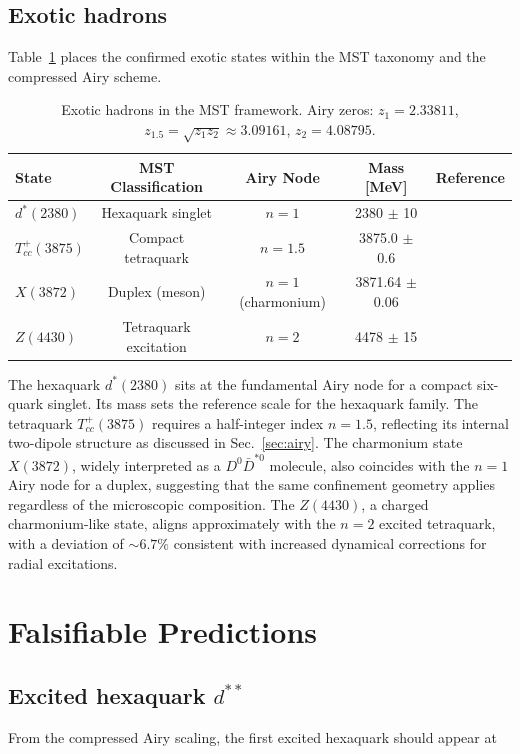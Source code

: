 \documentclass[12pt,a4paper]{article}
\theoremstyle{plain}
\theoremstyle{definition}
\theoremstyle{remark}
\begin{document}
\subsection{Exotic hadrons}
Table~\ref{tab:exotic_data} places the confirmed exotic states within the MST taxonomy and the compressed Airy scheme.

\begin{table}[H]
\centering
\caption{Exotic hadrons in the MST framework. Airy zeros: \(z_1=2.33811\), \(z_{1.5}= \sqrt{z_1 z_2} \approx 3.09161\), \(z_2=4.08795\).}
\label{tab:exotic_data}
\begin{tabular}{lcccc}
\toprule
State & MST Classification & Airy Node & Mass [MeV] & Reference \\
\midrule
\(d^*(2380)\) & Hexaquark singlet & \(n=1\) & 2380 \(\pm\) 10 & \cite{Bashkanov2024} \\
\(T_{cc}^+(3875)\) & Compact tetraquark & \(n=1.5\) & 3875.0 \(\pm\) 0.6 & \cite{Harada2025} \\
\(X(3872)\) & Duplex (meson) & \(n=1\) (charmonium) & 3871.64 \(\pm\) 0.06 & \cite{PDG2024} \\
\(Z(4430)\) & Tetraquark excitation & \(n=2\) & 4478 \(\pm\) 15 & \cite{LHCb2014} \\
\bottomrule
\end{tabular}
\end{table}

The hexaquark \(d^*(2380)\) sits at the fundamental Airy node for a compact six-quark singlet. Its mass sets the reference scale for the hexaquark family. The tetraquark \(T_{cc}^+(3875)\) requires a half-integer index \(n=1.5\), reflecting its internal two-dipole structure as discussed in Sec.~\ref{sec:airy}. The charmonium state \(X(3872)\), widely interpreted as a \(D^0\bar{D}^{*0}\) molecule, also coincides with the \(n=1\) Airy node for a duplex, suggesting that the same confinement geometry applies regardless of the microscopic composition. The \(Z(4430)\), a charged charmonium-like state, aligns approximately with the \(n=2\) excited tetraquark, with a deviation of \(\sim 6.7\%\) consistent with increased dynamical corrections for radial excitations.

\section{Falsifiable Predictions}
\label{sec:predictions}

\subsection{Excited hexaquark \(d^{**}\)}
From the compressed Airy scaling, the first excited hexaquark should appear at
\end{document}
